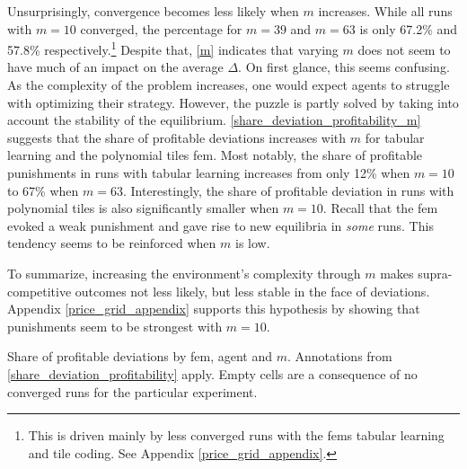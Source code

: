 Unsurprisingly, convergence becomes less likely when $m$ increases. While all runs with $m=10$ converged, the percentage for $m=39$ and $m=63$ is only  67.2\% and 57.8\% respectively.\footnote{ This is driven mainly by less converged runs with the \gls{fem}s tabular learning and tile coding. See Appendix \ref{price_grid_appendix}.} Despite that, \autoref{m} indicates that varying $m$ does not seem to have much of an impact on the average $\Delta$. On first glance, this seems confusing. As the complexity of the problem increases, one would expect agents to struggle with optimizing their strategy. However, the puzzle is partly solved by taking into account the stability of the equilibrium. \autoref{share_deviation_profitability_m} suggests that the share of profitable deviations increases with $m$ for tabular learning and the polynomial tiles \gls{fem}. Most notably, the share of profitable punishments in runs with tabular learning increases from only 12\% when $m=10$ to 67\% when $m=63$. Interestingly, the share of profitable deviation in runs with polynomial tiles is also significantly smaller when $m=10$. Recall that the \gls{fem} evoked a weak punishment and gave rise to new equilibria in \emph{some} runs. This tendency seems to be reinforced when $m$ is low.

To summarize, increasing the environment's complexity through $m$ makes supra-competitive outcomes not less likely, but less stable in the face of deviations. Appendix \ref{price_grid_appendix} supports this hypothesis by showing that punishments seem to be strongest with $m = 10$.

\begin{table}
	\centering
	
	\caption[Share of profitable deviations by \gls{fem}, agent and $m$]{Share of profitable deviations by \gls{fem}, agent and $m$. Annotations from \autoref{share_deviation_profitability} apply. Empty cells are a consequence of no converged runs for the particular experiment.}
	\label{share_deviation_profitability_m}
\end{table}


